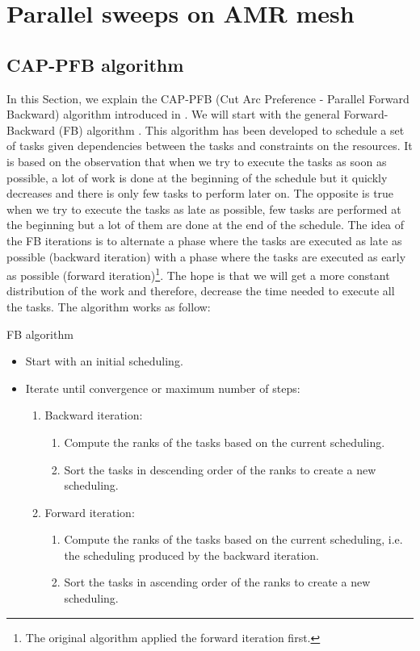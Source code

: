 \documentclass[letterpaper]{article}
\renewcommand{\(}{\left(}
\renewcommand{\)}{\right)}
\renewcommand{\[}{\left[}
\renewcommand{\]}{\right]}
\begin{document}
\section{Parallel sweeps on AMR mesh} \label{parallel_sweeps}
\subsection{CAP-PFB algorithm}
In this Section, we explain the CAP-PFB (Cut Arc Preference - Parallel Forward
Backward) algorithm introduced in \cite{Mo2014}. We will start with the general
Forward-Backward (FB) algorithm \cite{Li1992}. This algorithm has been developed
to schedule a set of tasks given dependencies between the tasks and constraints
on the resources. It is based on the observation that when we try to execute the
tasks as soon as possible, a lot of work is done at the beginning of the
schedule but it quickly decreases and there is only few tasks to perform later
on. The opposite is true when we try to execute the tasks as late as possible,
few tasks are performed at the beginning but a lot of them are done at the end
of the schedule. The idea of the FB iterations is to alternate a phase where the
tasks are executed as late as possible (backward iteration) with a phase where the
tasks are executed as early as possible (forward iteration)\footnote{The
original algorithm applied the forward iteration first.}. The hope is
that we will get a more constant distribution of the work and therefore,
decrease the time needed to execute all the tasks. The algorithm works as
follow:
\begin{algorithm}[H]
  \caption{FB algorithm}
  \begin{itemize}
    \item Start with an initial scheduling.
    \item Iterate until convergence or maximum number of steps:
      \begin{enumerate}
        \item Backward iteration:
          \begin{enumerate}
            \item Compute the ranks of the tasks based on the current scheduling.
            \item Sort the tasks in descending order of the ranks to create a
              new scheduling.
          \end{enumerate}
        \item Forward iteration:
          \begin{enumerate}
            \item Compute the ranks of the tasks based on the current
              scheduling, i.e. the scheduling produced by the backward
              iteration.
            \item Sort the tasks in ascending order of the ranks to create a new
              scheduling.
          \end{enumerate}
      \end{enumerate}
  \end{itemize}
  \label{fb}
\end{algorithm}
\end{document}
